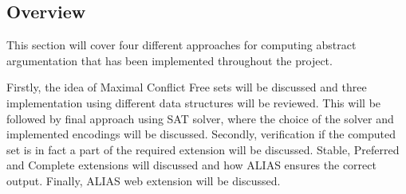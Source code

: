 \subsection{Overview}
This section will cover four different approaches for computing abstract argumentation that has been implemented throughout the project. 

Firstly, the idea of Maximal Conflict Free sets will be discussed and three implementation using different data structures will be reviewed. This will be followed by final approach using SAT solver, where the choice of the solver and implemented encodings will be discussed. Secondly, verification if the computed set is in fact a part of the required extension will be discussed. Stable, Preferred and Complete extensions will discussed and how ALIAS ensures the correct output. Finally, ALIAS web extension will be discussed.